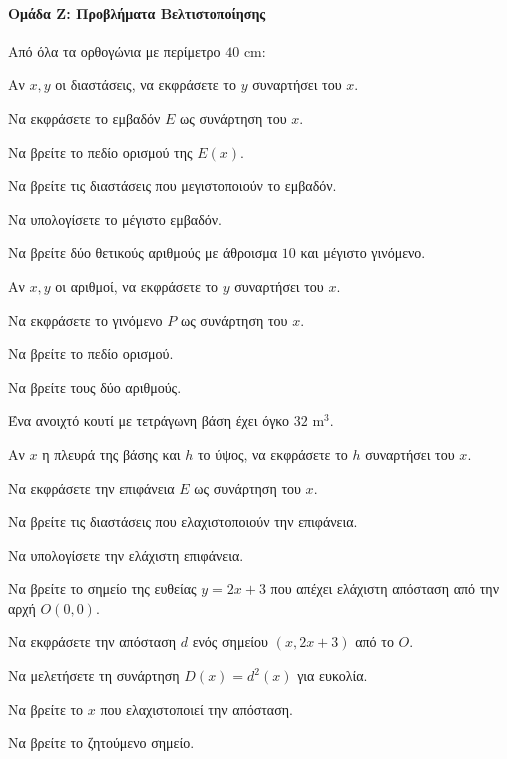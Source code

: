 \documentclass[11pt,a4paper,modern]{FFExercises}
\begin{document}
\paragraph{Ομάδα Ζ: Προβλήματα Βελτιστοποίησης}

\askhsh
Από όλα τα ορθογώνια με περίμετρο $40$ cm:
\begin{alist}
    \item Αν $x, y$ οι διαστάσεις, να εκφράσετε το $y$ συναρτήσει του $x$.
    \item Να εκφράσετε το εμβαδόν $E$ ως συνάρτηση του $x$.
    \item Να βρείτε το πεδίο ορισμού της $E(x)$.
    \item Να βρείτε τις διαστάσεις που μεγιστοποιούν το εμβαδόν.
    \item Να υπολογίσετε το μέγιστο εμβαδόν.
\end{alist}

\askhsh
Να βρείτε δύο θετικούς αριθμούς με άθροισμα $10$ και μέγιστο γινόμενο.
\begin{alist}
    \item Αν $x, y$ οι αριθμοί, να εκφράσετε το $y$ συναρτήσει του $x$.
    \item Να εκφράσετε το γινόμενο $P$ ως συνάρτηση του $x$.
    \item Να βρείτε το πεδίο ορισμού.
    \item Να βρείτε τους δύο αριθμούς.
\end{alist}

\askhsh
Ένα ανοιχτό κουτί με τετράγωνη βάση έχει όγκο $32 \text{ m}^3$.
\begin{alist}
    \item Αν $x$ η πλευρά της βάσης και $h$ το ύψος, να εκφράσετε το $h$ συναρτήσει του $x$.
    \item Να εκφράσετε την επιφάνεια $E$ ως συνάρτηση του $x$.
    \item Να βρείτε τις διαστάσεις που ελαχιστοποιούν την επιφάνεια.
    \item Να υπολογίσετε την ελάχιστη επιφάνεια.
\end{alist}

\askhsh
Να βρείτε το σημείο της ευθείας $y = 2x + 3$ που απέχει ελάχιστη απόσταση από την αρχή $O(0,0)$.
\begin{alist}
    \item Να εκφράσετε την απόσταση $d$ ενός σημείου $(x, 2x+3)$ από το $O$.
    \item Να μελετήσετε τη συνάρτηση $D(x) = d^2(x)$ για ευκολία.
    \item Να βρείτε το $x$ που ελαχιστοποιεί την απόσταση.
    \item Να βρείτε το ζητούμενο σημείο.
\end{alist}
\end{document}
